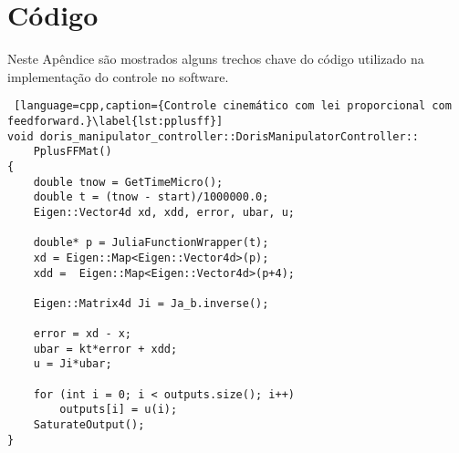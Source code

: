 \chapter{Código} \label{chap:code}

Neste Apêndice são mostrados alguns trechos chave do código utilizado na implementação do controle no software. 


\begin{lstlisting} [language=cpp,caption={Controle cinemático com lei proporcional com feedforward.}\label{lst:pplusff}]
void doris_manipulator_controller::DorisManipulatorController::
	PplusFFMat()
{
    double tnow = GetTimeMicro();
    double t = (tnow - start)/1000000.0;
    Eigen::Vector4d xd, xdd, error, ubar, u;

    double* p = JuliaFunctionWrapper(t);
    xd = Eigen::Map<Eigen::Vector4d>(p);
    xdd =  Eigen::Map<Eigen::Vector4d>(p+4);

    Eigen::Matrix4d Ji = Ja_b.inverse();

    error = xd - x;
    ubar = kt*error + xdd;
    u = Ji*ubar;

    for (int i = 0; i < outputs.size(); i++)
        outputs[i] = u(i);
    SaturateOutput();
}
\end{lstlisting}

